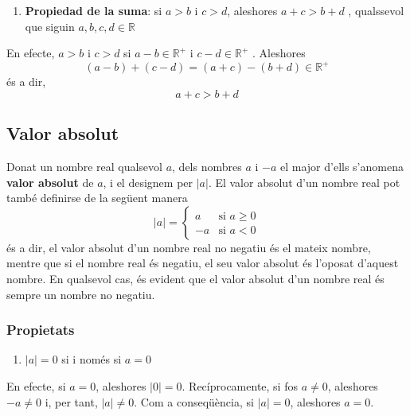 \begin{enumerate}
\item[8.] \textbf{Propiedad de la suma}: si $a>b$ i $c>d$, aleshores $a+c>b+d$%
, qualssevol que siguin $a,b,c,d\in \mathbb{R}$
\end{enumerate}

En efecte, $a>b$ i $c>d$ si $a-b\in \mathbb{R}^{+}$ i $c-d\in \mathbb{R}^{+}$%
. Aleshores%
\begin{equation*}
(a-b)+(c-d)=(a+c)-(b+d)\in \mathbb{R}^{+}
\end{equation*}%
és a dir,%
\begin{equation*}
a+c>b+d
\end{equation*}

\subsection{Valor absolut}

Donat un nombre real qualsevol $a$, dels nombres $a$ i $-a$ el
major d’ells s’anomena \textbf{valor absolut} de $a$, i el designem per $%
\left\vert a\right\vert $. El valor absolut d’un nombre real pot
també definirse de la següent manera%
\begin{equation*}
\left\vert a\right\vert =\left\{ 
\begin{array}{ll}
a & \text{si }a\geq 0 \\ 
-a & \text{si }a<0%
\end{array}%
\right.
\end{equation*}%
és a dir, el valor absolut d’un nombre real no negatiu és el mateix nombre, mentre que si el nombre real és negatiu, el seu valor absolut
és l’oposat d’aquest nombre. En qualsevol cas, és evident que el
valor absolut d’un nombre real és sempre un nombre no negatiu.

\subsubsection{Propietats}

\begin{enumerate}
\item $\left\vert a\right\vert =0$ si i només si $a=0$
\end{enumerate}

En efecte, si $a=0$, aleshores $\left\vert 0\right\vert =0$. Recíprocamente, si fos $a\neq 0$, aleshores $-a\neq 0$ i, per tant, $%
\left\vert a\right\vert \neq 0$. Com a conseqüència, si $\left\vert
a\right\vert =0$, aleshores $a=0$.

